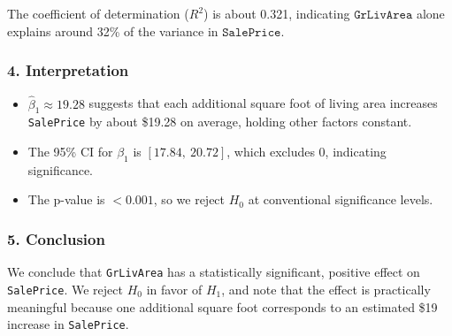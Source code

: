 \documentclass{article}
\begin{document}
The coefficient of determination (\(R^2\)) is about 0.321, indicating \(\texttt{GrLivArea}\) alone explains around 32\% of the variance in \(\texttt{SalePrice}\).

\subsubsection*{4. Interpretation}
\begin{itemize}
    \item \(\hat{\beta}_1 \approx 19.28\) suggests that each additional square foot of living area increases \texttt{SalePrice} by about \$19.28 on average, holding other factors constant.
    \item The 95\% CI for \(\beta_1\) is \([17.84,\ 20.72]\), which excludes 0, indicating significance.
    \item The p-value is \(< 0.001\), so we reject \(H_0\) at conventional significance levels.
\end{itemize}

\subsubsection*{5. Conclusion}
We conclude that \texttt{GrLivArea} has a statistically significant, positive effect on \texttt{SalePrice}. We reject \(H_0\) in favor of \(H_1\), and note that the effect is practically meaningful because one additional square foot corresponds to an estimated \$19 increase in \texttt{SalePrice}.
\end{document}
